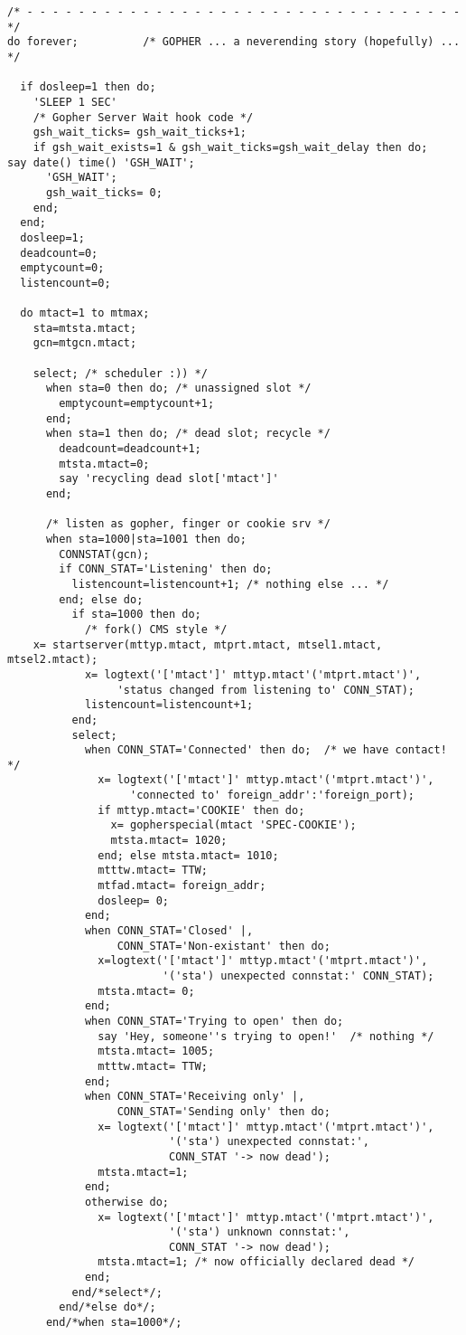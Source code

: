\begin{verbatim}
/* - - - - - - - - - - - - - - - - - - - - - - - - - - - - - - - - - - */
do forever;          /* GOPHER ... a neverending story (hopefully) ... */

  if dosleep=1 then do;
    'SLEEP 1 SEC'
    /* Gopher Server Wait hook code */
    gsh_wait_ticks= gsh_wait_ticks+1;
    if gsh_wait_exists=1 & gsh_wait_ticks=gsh_wait_delay then do;
say date() time() 'GSH_WAIT';
      'GSH_WAIT';
      gsh_wait_ticks= 0;
    end;
  end;
  dosleep=1;
  deadcount=0;
  emptycount=0;
  listencount=0;

  do mtact=1 to mtmax;
    sta=mtsta.mtact;
    gcn=mtgcn.mtact;

    select; /* scheduler :)) */
      when sta=0 then do; /* unassigned slot */
        emptycount=emptycount+1;
      end;
      when sta=1 then do; /* dead slot; recycle */
        deadcount=deadcount+1;
        mtsta.mtact=0;
        say 'recycling dead slot['mtact']'
      end;

      /* listen as gopher, finger or cookie srv */
      when sta=1000|sta=1001 then do;
        CONNSTAT(gcn);
        if CONN_STAT='Listening' then do;
          listencount=listencount+1; /* nothing else ... */
        end; else do;
          if sta=1000 then do;
            /* fork() CMS style */
    x= startserver(mttyp.mtact, mtprt.mtact, mtsel1.mtact, mtsel2.mtact);
            x= logtext('['mtact']' mttyp.mtact'('mtprt.mtact')',
                 'status changed from listening to' CONN_STAT);
            listencount=listencount+1;
          end;
          select;
            when CONN_STAT='Connected' then do;  /* we have contact! */
              x= logtext('['mtact']' mttyp.mtact'('mtprt.mtact')',
                   'connected to' foreign_addr':'foreign_port);
              if mttyp.mtact='COOKIE' then do;
                x= gopherspecial(mtact 'SPEC-COOKIE');
                mtsta.mtact= 1020;
              end; else mtsta.mtact= 1010;
              mtttw.mtact= TTW;
              mtfad.mtact= foreign_addr;
              dosleep= 0;
            end;
            when CONN_STAT='Closed' |,
                 CONN_STAT='Non-existant' then do;
              x=logtext('['mtact']' mttyp.mtact'('mtprt.mtact')',
                        '('sta') unexpected connstat:' CONN_STAT);
              mtsta.mtact= 0;
            end;
            when CONN_STAT='Trying to open' then do;
              say 'Hey, someone''s trying to open!'  /* nothing */
              mtsta.mtact= 1005;
              mtttw.mtact= TTW;
            end;
            when CONN_STAT='Receiving only' |,
                 CONN_STAT='Sending only' then do;
              x= logtext('['mtact']' mttyp.mtact'('mtprt.mtact')',
                         '('sta') unexpected connstat:',
                         CONN_STAT '-> now dead');
              mtsta.mtact=1;
            end;
            otherwise do;
              x= logtext('['mtact']' mttyp.mtact'('mtprt.mtact')',
                         '('sta') unknown connstat:',
                         CONN_STAT '-> now dead');
              mtsta.mtact=1; /* now officially declared dead */
            end;
          end/*select*/;
        end/*else do*/;
      end/*when sta=1000*/;


\end{verbatim}
